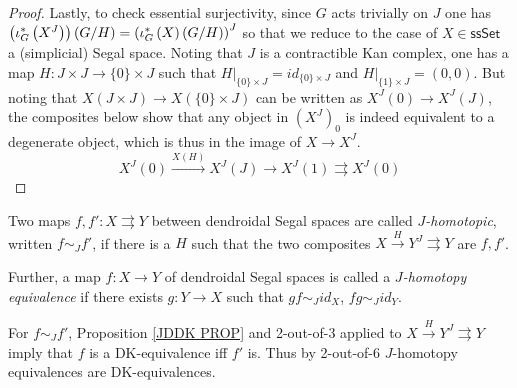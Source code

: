 \documentclass[a4paper,10pt
,draft
]{article}%
\begin{document}
\begin{proof}
Lastly, to check essential surjectivity, 
since $G$ acts trivially on $J$ one has
$\left(\iota_G^{\**}\left( X^J \right)\right)(G/H)=
\left(\iota_G^{\**}\left( X \right)(G/H)\right)^J$
so that we reduce to the case of $X \in \mathsf{ssSet}$ a (simplicial) Segal space.
Noting that $J$ is a contractible Kan complex,
one has a map 
$H \colon J \times J \to \{0\} \times J$
such that 
$H|_{\{0\}\times J} = id_{\{0\} \times J}$
and
$H|_{\{1\}\times J} = (0,0)$.
But noting that 
$X(J \times J) \to X(\{0\} \times J)$
can be written as 
$X^J(0) \to X^J(J)$, the composites below
show that any object in $\left(X^J\right)_0$ is indeed equivalent to a 
degenerate object, which is thus in the image of $X\to X^J$.
\[
	X^J(0) \xrightarrow{X(H)} 
	X^{J}(J) \to
	X^J(1) \rightrightarrows X^J(0)
\]
%
\end{proof}


\begin{definition}
	Two maps $f,f'\colon X \rightrightarrows Y$ between dendroidal Segal spaces are called \textit{$J$-homotopic}, written $f \sim_J f'$, if
	there is a $H$ such that
	the two composites
	$X \xrightarrow{H} Y^J \rightrightarrows Y$
	are $f,f'$.
	
	Further, a map $f\colon X \to Y$ of dendroidal Segal spaces is called a \textit{$J$-homotopy equivalence} if there exists $g \colon Y \to X$
	such that $gf \sim_J id_X$, $fg \sim_J id_Y$.
\end{definition}


\begin{remark}
	For $f\sim_J f'$, Proposition \ref{JDDK PROP} and 2-out-of-3 applied to $X \xrightarrow{H} Y^J \rightrightarrows Y$ imply that $f$ is a DK-equivalence iff $f'$ is.
	Thus by 2-out-of-6 $J$-homotopy equivalences are DK-equivalences.
\end{remark}
\end{document}

